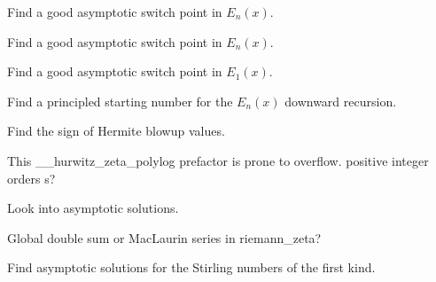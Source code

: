 \begin{DoxyRefList}
Find a good asymptotic switch point in $ E_n(x) $. 

Find a good asymptotic switch point in $ E_n(x) $.  
\item[\label{todo__todo000010}%
\Hypertarget{todo__todo000010}%
Member \hyperlink{namespacestd_1_1____detail_a665eb0c524b929c035d88bbb17815917}{std\+:\+:\+\_\+\+\_\+detail\+:\+:\+\_\+\+\_\+expint\+\_\+\+E1} (\+\_\+\+Tp \+\_\+\+\_\+x)]Find a good asymptotic switch point in $ E_1(x) $.  
\item[\label{todo__todo000009}%
\Hypertarget{todo__todo000009}%
Member \hyperlink{namespacestd_1_1____detail_a9b0a2050324390fb6c4a584170289a99}{std\+:\+:\+\_\+\+\_\+detail\+:\+:\+\_\+\+\_\+expint\+\_\+\+En\+\_\+recursion} (unsigned int \+\_\+\+\_\+n, \+\_\+\+Tp \+\_\+\+\_\+x)]Find a principled starting number for the $ E_n(x) $ downward recursion.  
\item[\label{todo__todo000013}%
\Hypertarget{todo__todo000013}%
Member \hyperlink{namespacestd_1_1____detail_addad9d3f5ca8a7ddae63c9e7c5374e70}{std\+:\+:\+\_\+\+\_\+detail\+:\+:\+\_\+\+\_\+hermite\+\_\+recur} (unsigned int \+\_\+\+\_\+n, \+\_\+\+Tp \+\_\+\+\_\+x)]Find the sign of Hermite blowup values.  
\item[\label{todo__todo000014}%
\Hypertarget{todo__todo000014}%
Member \hyperlink{namespacestd_1_1____detail_a7c45415c3ec0e137eea2364a6dd3af4e}{std\+:\+:\+\_\+\+\_\+detail\+:\+:\+\_\+\+\_\+hurwitz\+\_\+zeta\+\_\+polylog} (\+\_\+\+Tp \+\_\+\+\_\+s, std\+::complex$<$ \+\_\+\+Tp $>$ \+\_\+\+\_\+a)]This \+\_\+\+\_\+hurwitz\+\_\+zeta\+\_\+polylog prefactor is prone to overflow. positive integer orders s?  
\item[\label{todo__todo000017}%
\Hypertarget{todo__todo000017}%
Member \hyperlink{namespacestd_1_1____detail_a7ba1fde0547236676d579b6405f2fb25}{std\+:\+:\+\_\+\+\_\+detail\+:\+:\+\_\+\+\_\+log\+\_\+stirling\+\_\+2} (unsigned int \+\_\+\+\_\+n, unsigned int \+\_\+\+\_\+m)]Look into asymptotic solutions.  
\item[\label{todo__todo000019}%
\Hypertarget{todo__todo000019}%
Member \hyperlink{namespacestd_1_1____detail_a2be77d9bdd1b8b463be44a0e7558bc2a}{std\+:\+:\+\_\+\+\_\+detail\+:\+:\+\_\+\+\_\+riemann\+\_\+zeta} (\+\_\+\+Tp \+\_\+\+\_\+s)]Global double sum or Mac\+Laurin series in riemann\+\_\+zeta?  
\item[\label{todo__todo000018}%
\Hypertarget{todo__todo000018}%
Member \hyperlink{namespacestd_1_1____detail_a8b215e4ca28ec9b7b078d7f3d9aecc17}{std\+:\+:\+\_\+\+\_\+detail\+:\+:\+\_\+\+\_\+stirling\+\_\+1} (unsigned int \+\_\+\+\_\+n, unsigned int \+\_\+\+\_\+m)]Find asymptotic solutions for the Stirling numbers of the first kind. 


\end{DoxyRefList}
